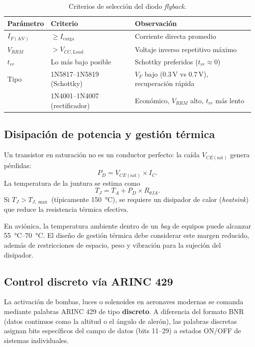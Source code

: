 \documentclass[11pt]{article}
\begin{document}
\begin{table}[H]\centering
\caption{Criterios de selección del diodo \emph{flyback}.}
\begin{tabular}{lll}
\toprule
Parámetro & Criterio & Observación \\
\midrule
$I_{F(\text{AV})}$ & $\ge I_\text{carga}$ & Corriente directa promedio \\
$V_{RRM}$ & $> V_{CC,\text{Load}}$ & Voltaje inverso repetitivo máximo \\
$t_{rr}$ & Lo más bajo posible & Schottky preferidos ($t_{rr}\approx 0$) \\
Tipo & 1N5817--1N5819 (Schottky) & $V_F$ bajo (0.3\,V vs 0.7\,V), recuperación rápida \\
     & 1N4001--1N4007 (rectificador) & Económico, $V_{RRM}$ alto, $t_{rr}$ más lento \\
\bottomrule
\end{tabular}
\end{table}

\subsection{Disipación de potencia y gestión térmica}
Un transistor en saturación no es un conductor perfecto: la caída $V_{CE(\text{sat})}$
genera pérdidas:
\begin{equation}
  P_D = V_{CE(\text{sat})}\times I_C.
\end{equation}
La temperatura de la juntura se estima como
\begin{equation}
  T_J = T_A + P_D\times R_{\theta JA}.
\end{equation}
Si $T_J > T_{J,\max}$ (típicamente \SI{150}{\celsius}), se requiere un disipador de calor
(\emph{heatsink}) que reduce la resistencia térmica efectiva.

\begin{nota}
En aviónica, la temperatura ambiente dentro de un \emph{bay} de equipos puede alcanzar
\SIrange{55}{70}{\celsius}. El diseño de gestión térmica debe considerar este margen
reducido, además de restricciones de espacio, peso y vibración para la sujeción del
disipador.
\end{nota}

\subsection{Control discreto vía ARINC 429}
La activación de bombas, luces o solenoides en aeronaves modernas se comanda mediante
palabras ARINC 429 de tipo \textbf{discreto}. A diferencia del formato BNR (datos
continuos como la altitud o el ángulo de alerón), las palabras discretas asignan bits
específicos del campo de datos (bits 11--29) a estados ON/OFF de sistemas individuales.
\end{document}
